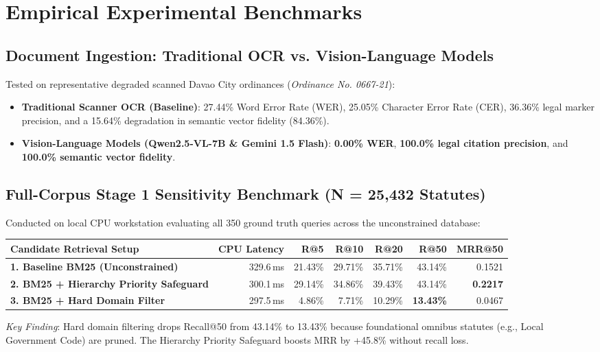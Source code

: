 \documentclass[10pt,letterpaper]{article}
\begin{document}
\section{Empirical Experimental Benchmarks}

\subsection{Document Ingestion: Traditional OCR vs. Vision-Language Models}
Tested on representative degraded scanned Davao City ordinances (\textit{Ordinance No. 0667-21}):
\begin{itemize}
    \item \textbf{Traditional Scanner OCR (Baseline)}: 27.44\% Word Error Rate (WER), 25.05\% Character Error Rate (CER), 36.36\% legal marker precision, and a 15.64\% degradation in semantic vector fidelity (84.36\%).
    \item \textbf{Vision-Language Models (Qwen2.5-VL-7B \& Gemini 1.5 Flash)}: \textbf{0.00\% WER}, \textbf{100.0\% legal citation precision}, and \textbf{100.0\% semantic vector fidelity}.
\end{itemize}

\subsection{Full-Corpus Stage 1 Sensitivity Benchmark (N = 25,432 Statutes)}
Conducted on local CPU workstation evaluating all 350 ground truth queries across the unconstrained database:

\vspace{0.4em}
\noindent\begin{tabularx}{\linewidth}{@{}Xrrrrrr@{}}
    \toprule
    \textbf{Candidate Retrieval Setup} & \textbf{CPU Latency} & \textbf{R@5} & \textbf{R@10} & \textbf{R@20} & \textbf{R@50} & \textbf{MRR@50} \\
    \midrule
    \textbf{1. Baseline BM25 (Unconstrained)} & 329.6\,ms & 21.43\% & 29.71\% & 35.71\% & 43.14\% & 0.1521 \\
    \textbf{2. BM25 + Hierarchy Priority Safeguard} & 300.1\,ms & 29.14\% & 34.86\% & 39.43\% & 43.14\% & \textbf{0.2217} \\
    \textbf{3. BM25 + Hard Domain Filter} & 297.5\,ms & 4.86\% & 7.71\% & 10.29\% & \textbf{13.43\%} & 0.0467 \\
    \bottomrule
\end{tabularx}
\vspace{0.3em}
\textit{Key Finding}: Hard domain filtering drops Recall@50 from 43.14\% to 13.43\% because foundational omnibus statutes (e.g., Local Government Code) are pruned. The Hierarchy Priority Safeguard boosts MRR by +45.8\% without recall loss.
\end{document}

